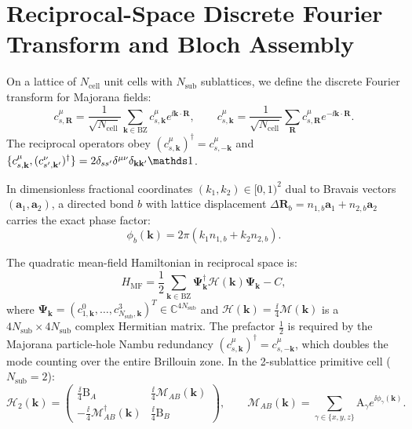 \section{Reciprocal-Space Discrete Fourier Transform and Bloch Assembly}
\label{sec:m1_2_bloch_assembly}
On a lattice of $N_{\mathrm{cell}}$ unit cells with $N_{\mathrm{sub}}$ sublattices, we define the discrete Fourier transform for Majorana fields:
\begin{equation}
\label{eq:m1_2_dft}
c_{s, \mathbf{R}}^\mu = \frac{1}{\sqrt{N_{\mathrm{cell}}}} \sum_{\mathbf{k} \in \mathrm{BZ}} c_{s, \mathbf{k}}^\mu e^{\ii \mathbf{k} \cdot \mathbf{R}}, \qquad c_{s, \mathbf{k}}^\mu = \frac{1}{\sqrt{N_{\mathrm{cell}}}} \sum_{\mathbf{R}} c_{s, \mathbf{R}}^\mu e^{-\ii \mathbf{k} \cdot \mathbf{R}}.
\end{equation}
The reciprocal operators obey $(c_{s, \mathbf{k}}^\mu)^\dagger = c_{s, -\mathbf{k}}^\mu$ and $\{c_{s, \mathbf{k}}^\mu, (c_{s', \mathbf{k}'}^\nu)^\dagger\} = 2\delta_{ss'} \delta^{\mu\nu} \delta_{\mathbf{k}\mathbf{k}'} \Id$.

In dimensionless fractional coordinates $(k_1, k_2) \in [0, 1)^2$ dual to Bravais vectors $(\mathbf{a}_1, \mathbf{a}_2)$, a directed bond $b$ with lattice displacement $\Delta \mathbf{R}_b = n_{1, b} \mathbf{a}_1 + n_{2, b} \mathbf{a}_2$ carries the exact phase factor:
\begin{equation}
\label{eq:m1_2_bond_phase}
\phi_b(\mathbf{k}) = 2\pi(k_1 n_{1, b} + k_2 n_{2, b}).
\end{equation}

\begin{definition}
\label{def:m1_2_bloch_matrix}
The quadratic mean-field Hamiltonian in reciprocal space is:
\begin{equation}
\label{eq:m1_2_bloch_hamiltonian_operator}
H_{\mathrm{MF}} = \frac{1}{2} \sum_{\mathbf{k} \in \mathrm{BZ}} \boldsymbol{\Psi}_{\mathbf{k}}^\dagger \mathcal{H}(\mathbf{k}) \boldsymbol{\Psi}_{\mathbf{k}} - C,
\end{equation}
where $\boldsymbol{\Psi}_{\mathbf{k}} = (c_{1, \mathbf{k}}^0, \dots, c_{N_{\mathrm{sub}}, \mathbf{k}}^3)^T \in \mathbb{C}^{4 N_{\mathrm{sub}}}$ and $\mathcal{H}(\mathbf{k}) = \frac{\ii}{4}\mathcal{M}(\mathbf{k})$ is a $4 N_{\mathrm{sub}} \times 4 N_{\mathrm{sub}}$ complex Hermitian matrix.
The prefactor $\frac{1}{2}$ is required by the Majorana particle-hole Nambu redundancy $(c_{s, \mathbf{k}}^\mu)^\dagger = c_{s, -\mathbf{k}}^\mu$, which doubles the mode counting over the entire Brillouin zone.
In the 2-sublattice primitive cell ($N_{\mathrm{sub}} = 2$):
\begin{equation}
\label{eq:m1_2_bloch_2_sublattice}
\mathcal{H}_2(\mathbf{k}) = \begin{pmatrix} \frac{\ii}{4}\mathrm{B}_A & \frac{\ii}{4}\mathcal{M}_{AB}(\mathbf{k}) \\ -\frac{\ii}{4}\mathcal{M}_{AB}^\dagger(\mathbf{k}) & \frac{\ii}{4}\mathrm{B}_B \end{pmatrix}, \qquad \mathcal{M}_{AB}(\mathbf{k}) = \sum_{\gamma \in \{x, y, z\}} \mathrm{A}_\gamma e^{\ii \phi_\gamma(\mathbf{k})}.
\end{equation}
\end{definition}

